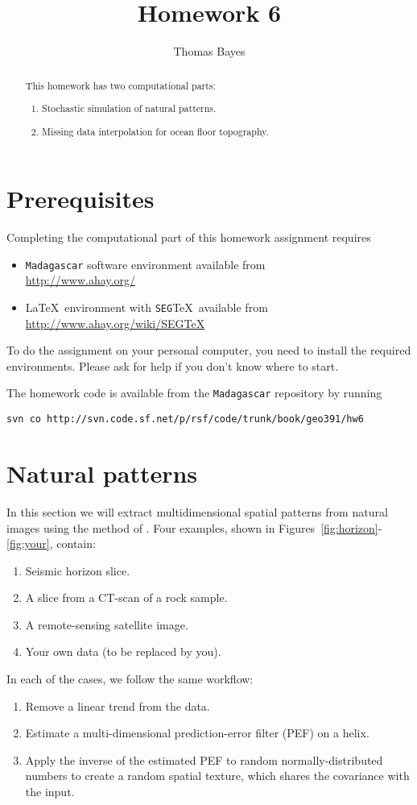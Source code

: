 \author{Thomas Bayes}
\title{Homework 6}

\begin{abstract}
  This homework has two computational parts:
  \begin{enumerate}
  \item Stochastic simulation of natural patterns.
  \item Missing data interpolation for ocean floor topography.
  \end{enumerate}
\end{abstract}

\section{Prerequisites}

Completing the computational part of this homework assignment requires
\begin{itemize}
\item \texttt{Madagascar} software environment available from \\
\url{http://www.ahay.org/}
\item \LaTeX\ environment with \texttt{SEG}\TeX\ available from \\ 
\url{http://www.ahay.org/wiki/SEGTeX}
\end{itemize}
To do the assignment on your personal computer, you need to install
the required environments. Please ask for help if you don't know where
to start.

The homework code is available from the \texttt{Madagascar} repository
by running
\begin{verbatim}
svn co http://svn.code.sf.net/p/rsf/code/trunk/book/geo391/hw6
\end{verbatim}

\section{Natural patterns}

In this section we will extract multidimensional spatial patterns from
natural images using the method of \cite{textures}. Four examples,
shown in Figures~\ref{fig:horizon}-\ref{fig:your}, contain:
\begin{enumerate}
\item Seismic horizon slice.
\item A slice from a CT-scan of a rock sample.
\item A remote-sensing satellite image.
\item Your own data (to be replaced by you).
\end{enumerate}
In each of the cases, we follow the same workflow:
\begin{enumerate}
\item Remove a linear trend from the data.
\item Estimate a multi-dimensional prediction-error filter (PEF) on a helix.
\item Apply the inverse of the estimated PEF to random normally-distributed numbers
  to create a random spatial texture, which shares the covariance with the input. 
\end{enumerate}

